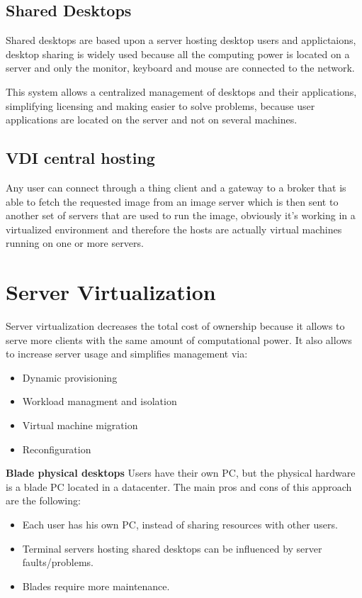 \subsection{Shared Desktops}
Shared desktops are based upon a server hosting desktop users and applictaions, desktop sharing is widely used because all the computing power is located on a server and only the monitor, keyboard and mouse are connected to the network.

This system allows a centralized management of desktops and their applications, simplifying licensing and making easier to solve problems, because user applications are located on the server and not on several machines.
\subsection{VDI central hosting}
Any user can connect through a thing client and a gateway to a broker that is able to fetch the requested image from an image server which is then sent to another set of servers that are used to run the image, obviously it's working in a virtualized environment and therefore the hosts are actually virtual machines running on one or more servers.
\section{Server Virtualization}
Server virtualization decreases the total cost of ownership because it allows to serve more clients with the same amount of computational power. It also allows to increase server usage and simplifies management via:
\begin{itemize}
    \item Dynamic provisioning
    \item Workload managment and isolation
    \item Virtual machine migration
    \item Reconfiguration
\end{itemize}
\textbf{Blade physical desktops}
Users have their own PC, but the physical hardware is a blade PC located in a datacenter. The main pros and cons of this approach are the following:
\begin{itemize}
    \item Each user has his own PC, instead of sharing resources with other users.
    \item Terminal servers hosting shared desktops can be influenced by server faults/problems.
    \item Blades require more maintenance.
\end{itemize}